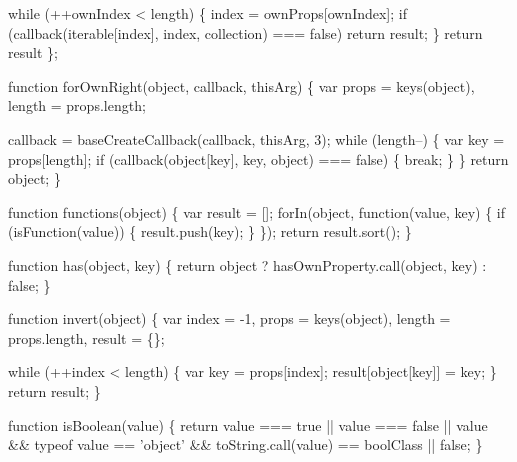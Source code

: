 \begin{DoxyCodeInclude}
        \textcolor{keywordflow}{while} (++ownIndex < length) \{
          index = ownProps[ownIndex];
          \textcolor{keywordflow}{if} (callback(iterable[index], index, collection) === \textcolor{keyword}{false}) \textcolor{keywordflow}{return} result;
        \}
      \textcolor{keywordflow}{return} result
    \};

    \textcolor{keyword}{function} forOwnRight(\textcolor{keywordtype}{object}, callback, thisArg) \{
      var props = keys(\textcolor{keywordtype}{object}),
          length = props.length;

      callback = baseCreateCallback(callback, thisArg, 3);
      \textcolor{keywordflow}{while} (length--) \{
        var key = props[length];
        \textcolor{keywordflow}{if} (callback(\textcolor{keywordtype}{object}[key], key, \textcolor{keywordtype}{object}) === \textcolor{keyword}{false}) \{
          \textcolor{keywordflow}{break};
        \}
      \}
      \textcolor{keywordflow}{return} object;
    \}

    \textcolor{keyword}{function} functions(\textcolor{keywordtype}{object}) \{
      var result = [];
      forIn(\textcolor{keywordtype}{object}, \textcolor{keyword}{function}(value, key) \{
        \textcolor{keywordflow}{if} (isFunction(value)) \{
          result.push(key);
        \}
      \});
      \textcolor{keywordflow}{return} result.sort();
    \}

    \textcolor{keyword}{function} has(\textcolor{keywordtype}{object}, key) \{
      \textcolor{keywordflow}{return} \textcolor{keywordtype}{object} ? hasOwnProperty.call(\textcolor{keywordtype}{object}, key) : \textcolor{keyword}{false};
    \}

    \textcolor{keyword}{function} invert(\textcolor{keywordtype}{object}) \{
      var index = -1,
          props = keys(\textcolor{keywordtype}{object}),
          length = props.length,
          result = \{\};

      \textcolor{keywordflow}{while} (++index < length) \{
        var key = props[index];
        result[\textcolor{keywordtype}{object}[key]] = key;
      \}
      \textcolor{keywordflow}{return} result;
    \}

    \textcolor{keyword}{function} isBoolean(value) \{
      \textcolor{keywordflow}{return} value === \textcolor{keyword}{true} || value === \textcolor{keyword}{false} ||
        value && typeof value == \textcolor{stringliteral}{'object'} && toString.call(value) == boolClass || \textcolor{keyword}{false};
    \}


\end{DoxyCodeInclude}
